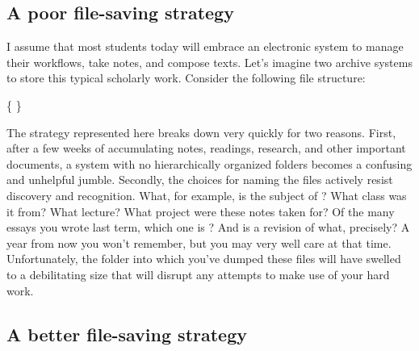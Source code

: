 \subsection{A poor file-saving strategy}

I assume that most students today will embrace an electronic system to manage their workflows, take notes, and compose texts. Let's imagine two archive systems to store this typical scholarly work. Consider the following file structure:

\medskip

{\large
{}  
}
 
\begin{center} \{  \} \end{center}

\noindent The strategy represented here breaks down very quickly for two reasons. First, after a few weeks of accumulating notes, readings, research, and other important documents, a system with no hierarchically organized folders becomes a confusing and unhelpful jumble. Secondly, the choices for naming the files actively resist discovery and recognition. What, for example, is the subject of ? What class was it from? What lecture? What project were these notes taken for? Of the many essays you wrote last term, which one is ? And  is a revision of what, precisely? A year from now you won't remember, but you may very well care at that time. Unfortunately, the folder into which you've dumped these files will have swelled to a debilitating size that will disrupt any attempts to make use of your hard work. 

\subsection{A better file-saving strategy}

